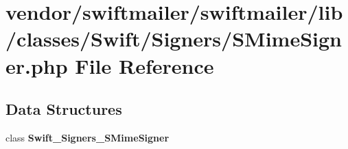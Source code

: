 \section{vendor/swiftmailer/swiftmailer/lib/classes/\+Swift/\+Signers/\+S\+Mime\+Signer.php File Reference}
\label{_s_mime_signer_8php}
\subsection*{Data Structures}
\begin{DoxyCompactItemize}
\item 
class {\bf Swift\+\_\+\+Signers\+\_\+\+S\+Mime\+Signer}
\end{DoxyCompactItemize}
